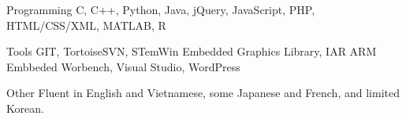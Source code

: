 


\begin{cvskills}


\cvskill
{Programming} %
{C, C++, Python, Java, jQuery, JavaScript, PHP, HTML/CSS/XML, MATLAB, R} %


\cvskill
{Tools} %
{GIT, TortoiseSVN, STemWin Embedded Graphics Library, IAR ARM Embbeded Worbench, Visual Studio, WordPress} %


\cvskill
{Other} %
{Fluent in English and Vietnamese, some Japanese and French, and limited Korean.} %


\end{cvskills}